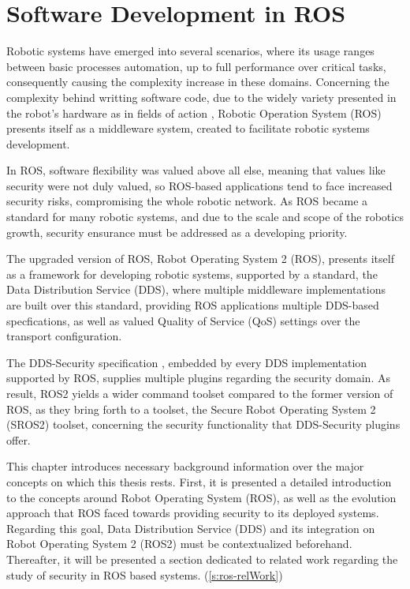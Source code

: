 \chapter{Software Development in ROS}\label{c:ros}

Robotic systems have emerged into several scenarios, where its usage ranges between basic processes automation, up to full performance over critical tasks, consequently causing the complexity increase in these domains. Concerning the complexity behind writting software code, due to the widely variety presented in the robot's hardware as in fields of action \cite{cousins2011exponential}, Robotic Operation System (ROS) presents itself as a middleware system, created to facilitate robotic systems development.

In ROS, software flexibility was valued above all else, meaning that values like security were not duly valued, so ROS-based applications tend to face increased security risks, compromising the whole robotic network. As ROS became a standard for many robotic systems, and due to the scale and scope of the robotics growth, security ensurance must be addressed as a developing priority. \cite{diluoffo2018robot, kim2018security}

The upgraded version of ROS, Robot Operating System 2 (ROS), presents itself as a framework for developing robotic systems, supported by a standard, the Data Distribution Service (DDS), where multiple middleware implementations are built over this standard, providing ROS applications multiple DDS-based specfications, as well as valued Quality of Service (QoS) settings over the transport configuration. 

The DDS-Security specification \cite{dds-s}, embedded by every DDS implementation supported by ROS, supplies multiple plugins regarding the security domain. As result, ROS2 yields a wider command toolset compared to the former version of ROS, as they bring forth to a toolset, the Secure Robot Operating System 2 (SROS2) toolset, concerning the security functionality that DDS-Security plugins offer.

This chapter introduces necessary background information over the major concepts on which this thesis rests. First, it is presented a detailed introduction to the concepts around Robot Operating System (ROS), as well as the evolution approach that ROS faced towards providing security to its deployed systems. Regarding this goal, Data Distribution Service (DDS) and its integration on Robot Operating System 2 (ROS2) must be contextualized beforehand. Thereafter, it will be presented a section dedicated to related work regarding the study of security in ROS based systems. (\ref{s:ros-relWork})


